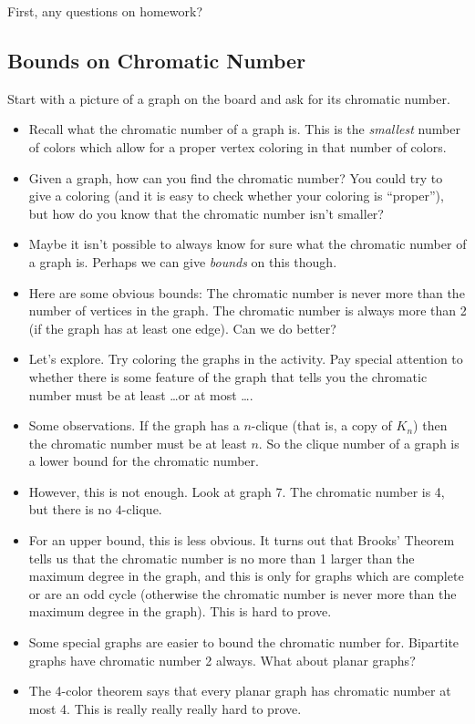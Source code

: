 \documentclass[12pt]{article}
\theoremstyle{plain}
\theoremstyle{definition}
\theoremstyle{remark}
\newcommand{\todayis}[1]{\clearpage{\rhead{\footnotesize #1}}}
\begin{document}
\todayis{Monday, November 13}

First, any questions on homework?

\subsection*{Bounds on Chromatic Number}

Start with a picture of a graph on the board and ask for its chromatic number.

\begin{itemize}
  \item Recall what the chromatic number of a graph is.  This is the \emph{smallest} number of colors which allow for a proper vertex coloring in that number of colors.

  \item Given a graph, how can you find the chromatic number?  You could try to give a coloring (and it is easy to check whether your coloring is ``proper''), but how do you know that the chromatic number isn't smaller?

  \item Maybe it isn't possible to always know for sure what the chromatic number of a graph is.  Perhaps we can give \emph{bounds} on this though.

  \item Here are some obvious bounds: The chromatic number is never more than the number of vertices in the graph.  The chromatic number is always more than 2 (if the graph has at least one edge).  Can we do better?

  \item Let's explore.  Try coloring the graphs in the activity.  Pay special attention to whether there is some feature of the graph that tells you the chromatic number must be at least \ldots or at most \ldots.

  \item Some observations.  If the graph has a $n$-clique (that is, a copy of $K_n$) then the chromatic number must be at least $n$.  So the clique number of a graph is a lower bound for the chromatic number.

  \item However, this is not enough.  Look at graph 7.  The chromatic number is 4, but there is no $4$-clique.

  \item For an upper bound, this is less obvious.  It turns out that Brooks' Theorem tells us that the chromatic number is no more than 1 larger than the maximum degree in the graph, and this is only for graphs which are complete or are an odd cycle (otherwise the chromatic number is never more than the maximum degree in the graph).  This is hard to prove.

  \item Some special graphs are easier to bound the chromatic number for.  Bipartite graphs have chromatic number 2 always.  What about planar graphs?

  \item The 4-color theorem says that every planar graph has chromatic number at most 4.  This is really really really hard to prove.
\end{itemize}
\end{document}
